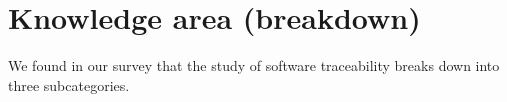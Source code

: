 \section{Knowledge area (breakdown)}\label{sec:ka}
We found in our survey that the study of software traceability breaks down into three subcategories. 


